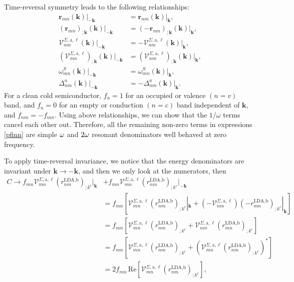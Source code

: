 Time-reversal symmetry leads to the following relationships:
\begin{align}\label{time_reversal}
    \mathbf{r}_{mn}(\mathbf{k})|_{-\mathbf{k}}
&=  \mathbf{r}_{nm}(\mathbf{k})|_{\mathbf{k}},\nonumber\\
    (\mathbf{r}_{mn})_{;\mathbf{k}}(\mathbf{k})|_{-\mathbf{k}}
&=  (-\mathbf{r}_{nm})_{;\mathbf{k}}(\mathbf{k})|_{\mathbf{k}},\nonumber\\
    \mathcal{V}^{\Sigma,\text{a},\ell}_{mn}(\mathbf{k})|_{-\mathbf{k}}
&=  -\mathbf{\mathcal{V}}_{nm}^{\Sigma,\text{a},\ell}(\mathbf{k})|_{\mathbf{k}},
    \nonumber\\
    (\mathcal{V}^{\Sigma,\text{a},\ell}_{mn})_{;\mathbf{k}}
    (\mathbf{k})|_{-\mathbf{k}}
&=  (\mathbf{\mathcal{V}}_{nm}^{\Sigma,\text{a},\ell})_{;\mathbf{k}}
    (\mathbf{k})|_{\mathbf{k}},\\
    \omega_{mn}^{S}(\mathbf{k})|_{-\mathbf{k}}
&=  \omega_{mn}^{S}(\mathbf{k})|_{\mathbf{k}},\nonumber\\
    \Delta^a_{nm}(\mathbf{k})|_{-\mathbf{k}}
&=  -\Delta^a_{nm}(\mathbf{k})|_{\mathbf{k}}.\nonumber
\end{align}
For a clean cold semiconductor, $f_{n} = 1$ for an occupied 
or valence $(n = v)$ band, and $f_{n} = 0$ for an empty 
or conduction $(n = c)$ band independent of $\mathbf{k}$, 
and $f_{nm}=-f_{mn}$.
Using above relationships, we can show that 
the $1/\omega$ terms cancel each other out. 
Therefore, all the remaining non-zero terms in expressions \eqref{pfinn}
are simple $\omega$ and $2\omega$ resonant denominators well behaved at zero
frequency. 

To apply time-reversal invariance,
we notice that the energy denominators are 
invariant under $\mathbf{k} \rightarrow - \mathbf{k}$, 
and then we only look at the numerators, then 
\begin{align}\label{ct}
C \rightarrow f_{mn}\mathcal{V}^{\Sigma,\text{a},\ell}_{mn}
    \left(r^{\text{LDA,b}}_{nm}\right)_{;k^{\text{c}}}|_{\mathbf{k}}
&+  f_{mn}\mathcal{V}^{\Sigma,\text{a},\ell}_{mn}
    \left(r^{\text{LDA,b}}_{nm}\right)_{;k^{\text{c}}}|_{-\mathbf{k}}\nonumber\\
&=  f_{mn}\left[\mathcal{V}^{\Sigma,\text{a},\ell}_{mn}
    \left(r^{\text{LDA,b}}_{nm}\right)_{;k^{\text{c}}}|_{\mathbf{k}} 
+   \left(-\mathcal{V}^{\Sigma,\text{a},\ell}_{nm}\right)
    \left(-r^{\text{LDA,b}}_{mn}\right)_{;k^{\text{c}}}|_{\mathbf{k}}\right]
    \nonumber\\
&= f_{mn}\left[\mathcal{V}^{\Sigma,\text{a},\ell}_{mn}
    \left(r^{\text{LDA,b}}_{nm}\right)_{;k^{\text{c}}}
+   \mathcal{V}^{\Sigma,\text{a},\ell}_{nm}
    \left(r^{\text{LDA,b}}_{mn}\right)_{;k^{\text{c}}}\right]\nonumber\\
&= f_{mn}\left[\mathcal{V}^{\Sigma,\text{a},\ell}_{mn} 
    \left(r^{\text{LDA,b}}_{nm}\right)_{;k^{\text{c}}}
+   \left(\mathcal{V}^{\Sigma,\text{a},\ell}_{mn}
    \left(r^{\text{LDA,b}}_{nm}\right)_{;k^{\text{c}}}\right)^*\right]\nonumber\\
&=  2f_{mn}\,\mathrm{Re}\left[\mathcal{V}^{\Sigma,\text{a},\ell}_{mn}
    \left(r^{\text{LDA,b}}_{nm}\right)_{;k^{\text{c}}}\right]
,
\end{align}

